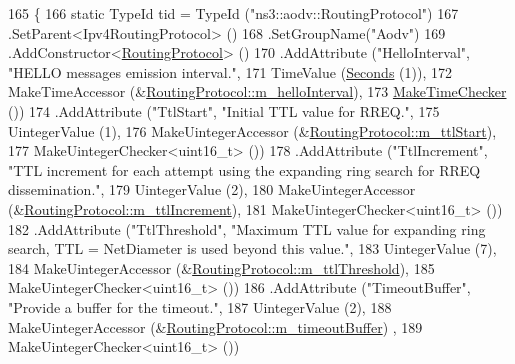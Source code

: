 \begin{DoxyCode}
165 \{
166   \textcolor{keyword}{static} TypeId tid = TypeId (\textcolor{stringliteral}{"ns3::aodv::RoutingProtocol"})
167     .SetParent<Ipv4RoutingProtocol> ()
168     .SetGroupName(\textcolor{stringliteral}{"Aodv"})
169     .AddConstructor<\hyperlink{classns3_1_1aodv_1_1RoutingProtocol_ad27c1423db534d49ebbd616b189567ae}{RoutingProtocol}> ()
170     .AddAttribute (\textcolor{stringliteral}{"HelloInterval"}, \textcolor{stringliteral}{"HELLO messages emission interval."},
171                    TimeValue (\hyperlink{group__timecivil_ga33c34b816f8ff6628e33d5c8e9713b9e}{Seconds} (1)),
172                    MakeTimeAccessor (&\hyperlink{classns3_1_1aodv_1_1RoutingProtocol_aa9750612eb154b537b1d7d0350cb8912}{RoutingProtocol::m\_helloInterval}),
173                    \hyperlink{group__time_ga7032965bd4afa578691d88c09e4481c1}{MakeTimeChecker} ())
174     .AddAttribute (\textcolor{stringliteral}{"TtlStart"}, \textcolor{stringliteral}{"Initial TTL value for RREQ."},
175                    UintegerValue (1),
176                    MakeUintegerAccessor (&\hyperlink{classns3_1_1aodv_1_1RoutingProtocol_abc9bab73b39d584866faf18e95704e0f}{RoutingProtocol::m\_ttlStart}),
177                    MakeUintegerChecker<uint16\_t> ())
178     .AddAttribute (\textcolor{stringliteral}{"TtlIncrement"}, \textcolor{stringliteral}{"TTL increment for each attempt using the expanding ring search for RREQ
       dissemination."},
179                    UintegerValue (2),
180                    MakeUintegerAccessor (&\hyperlink{classns3_1_1aodv_1_1RoutingProtocol_a7155a27e029832bfd90448bd6ae831db}{RoutingProtocol::m\_ttlIncrement}),
181                    MakeUintegerChecker<uint16\_t> ())
182     .AddAttribute (\textcolor{stringliteral}{"TtlThreshold"}, \textcolor{stringliteral}{"Maximum TTL value for expanding ring search, TTL = NetDiameter is used
       beyond this value."},
183                    UintegerValue (7),
184                    MakeUintegerAccessor (&\hyperlink{classns3_1_1aodv_1_1RoutingProtocol_a5fa99f38d3f75c20e1a89f4f2e60c42f}{RoutingProtocol::m\_ttlThreshold}),
185                    MakeUintegerChecker<uint16\_t> ())
186     .AddAttribute (\textcolor{stringliteral}{"TimeoutBuffer"}, \textcolor{stringliteral}{"Provide a buffer for the timeout."},
187                    UintegerValue (2),
188                    MakeUintegerAccessor (&\hyperlink{classns3_1_1aodv_1_1RoutingProtocol_a7805d2b1f8e48f3609f8770255a71e47}{RoutingProtocol::m\_timeoutBuffer})
      ,
189                    MakeUintegerChecker<uint16\_t> ())

\end{DoxyCode}

